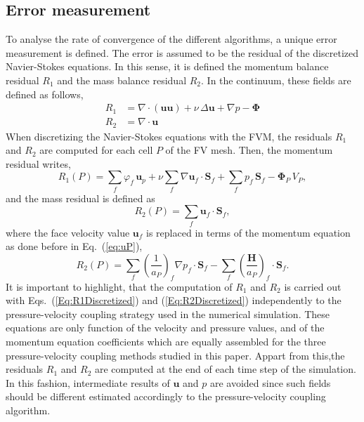 \documentclass[final,3p,times,11pt,onecolumn]{myElsarticle}
\numberwithin{equation}{section}
\begin{document}
\subsection{Error measurement}
To analyse the rate of convergence of the different algorithms, a unique error measurement is defined. The error is assumed to be the residual of the discretized Navier-Stokes equations. In this sense, it is defined the momentum balance residual $R_1$ and the mass balance residual $R_2$. In the continuum, these fields are defined as follows,
\begin{align}
R_1
&=
\nabla
\cdot
\left(
\boldsymbol{u}
\boldsymbol{u}
\right)
+
\nu\, \Delta \boldsymbol{u}
+
\nabla p 
-
\boldsymbol{\Phi}
\\
R_2
&=
\nabla
\cdot
\boldsymbol{u}
\end{align}
When discretizing the Navier-Stokes equations with the FVM, the residuals $R_1$ and $R_2$ are computed for each cell $P$ of the FV mesh. Then, the momentum residual writes,
\begin{equation}
\label{Eq:R1Discretized}
R_1(P)
=
\sum_{f}
\varphi_f\,
\boldsymbol{u}_p
+
\nu
\sum_f
\nabla \boldsymbol{u}_f
\cdot
\boldsymbol{S}_f
+
\sum_f
p_f
\,
\boldsymbol{S}_f
-
\boldsymbol{\Phi}_P \, V_P,
\end{equation}
and the mass residual is defined as
\begin{equation}
R_2(P)
=
\sum_f
\boldsymbol{u}_f
\cdot
\boldsymbol{S}_f,
\end{equation}
where the face velocity value $\boldsymbol{u}_f$ is replaced in terms of the momentum equation as done before in Eq.~(\ref{eq:uP}),
\begin{equation}
\label{Eq:R2Discretized}
R_2(P)
=
\sum_f 
\left(
\frac{1}{a_P}
\right)_f 
\nabla p_f
\cdot
\boldsymbol{S}_f 
-
\sum_f
\left(
\frac{\boldsymbol{H}}
{a_P}
\right)_f 
\cdot 
\boldsymbol{S}_f.
\end{equation}
It is important to highlight, that the computation of $R_1$ and $R_2$ is carried out with Eqs.~(\ref{Eq:R1Discretized}) and (\ref{Eq:R2Discretized}) independently to the pressure-velocity coupling strategy used in the numerical simulation. These equations are only function of the velocity and pressure values, and of the momentum equation coefficients which are equally assembled for the three pressure-velocity coupling methods studied in this paper. Appart from this,the residuals $R_1$ and $R_2$ are computed at the end of each time step of the simulation. In this fashion, intermediate results of $\mathbf{u}$ and $p$ are avoided since such fields should be different estimated accordingly to the pressure-velocity coupling algorithm. 
\end{document}
